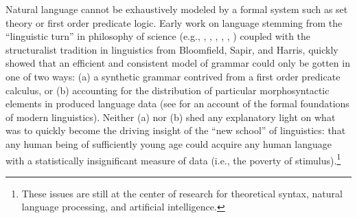 \documentclass[11pt,twoside]{article}
\begin{document}
Natural language cannot be exhaustively modeled by a formal system such as set theory or first order predicate logic. Early work on language stemming from the ``linguistic turn'' in philosophy of science (e.g., \cite{ayer:1936}, \cite{carnap:1937}, \cite{riechenbach:1947}, \cite{tarski:1956}, \cite{popper:1959}, \cite{quine:1953}) coupled with the structuralist tradition in linguistics from Bloomfield, Sapir, and Harris, quickly showed that an efficient and consistent model of grammar could only be gotten in one of two ways: (a) a synthetic grammar contrived from a first order predicate calculus, or (b) accounting for the distribution of particular morphosyntactic elements in produced language data (see \cite{tomalin:2006} for an account of the formal foundations of modern linguistics). Neither (a) nor (b) shed any explanatory light on what was to quickly become the driving insight of the ``new school'' of linguistics: that any human being of sufficiently young age could acquire any human language with a statistically insignificant measure of data (i.e., the poverty of stimulus).\footnote{These issues are still at the center of research for theoretical syntax, natural language processing, and artificial intelligence.}
 
\end{document}
